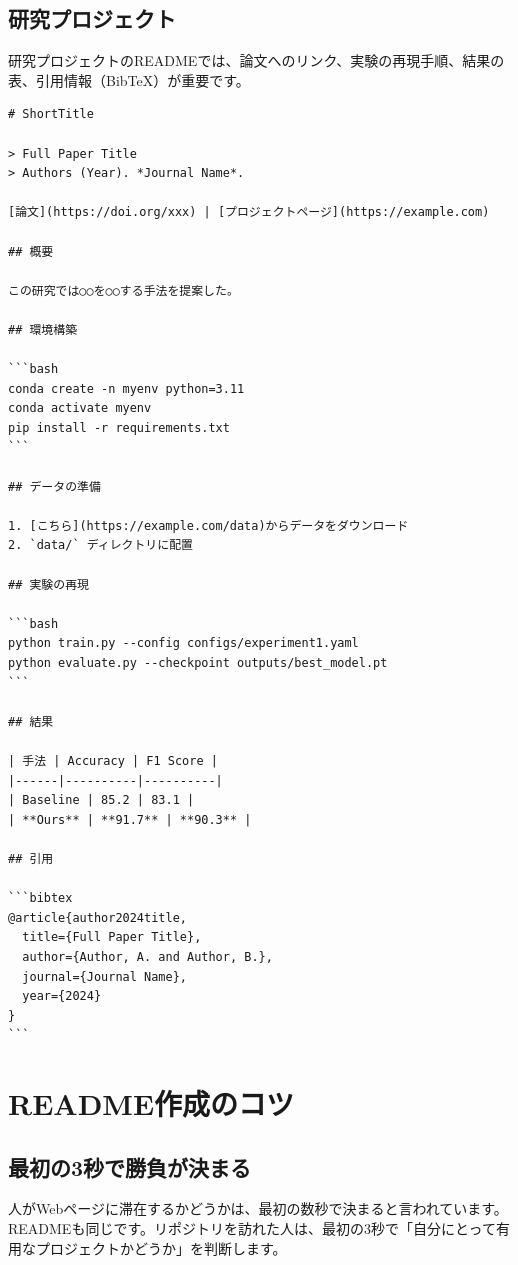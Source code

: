 \subsection{研究プロジェクト}

研究プロジェクトのREADMEでは、論文へのリンク、実験の再現手順、結果の表、引用情報（BibTeX）が重要です。

\begin{lstlisting}[language={}]
# ShortTitle

> Full Paper Title
> Authors (Year). *Journal Name*.

[論文](https://doi.org/xxx) | [プロジェクトページ](https://example.com)

## 概要

この研究では○○を○○する手法を提案した。

## 環境構築

```bash
conda create -n myenv python=3.11
conda activate myenv
pip install -r requirements.txt
```

## データの準備

1. [こちら](https://example.com/data)からデータをダウンロード
2. `data/` ディレクトリに配置

## 実験の再現

```bash
python train.py --config configs/experiment1.yaml
python evaluate.py --checkpoint outputs/best_model.pt
```

## 結果

| 手法 | Accuracy | F1 Score |
|------|----------|----------|
| Baseline | 85.2 | 83.1 |
| **Ours** | **91.7** | **90.3** |

## 引用

```bibtex
@article{author2024title,
  title={Full Paper Title},
  author={Author, A. and Author, B.},
  journal={Journal Name},
  year={2024}
}
```
\end{lstlisting}

\section{README作成のコツ}

\subsection{最初の3秒で勝負が決まる}

人がWebページに滞在するかどうかは、最初の数秒で決まると言われています。READMEも同じです。リポジトリを訪れた人は、最初の3秒で「自分にとって有用なプロジェクトかどうか」を判断します。

